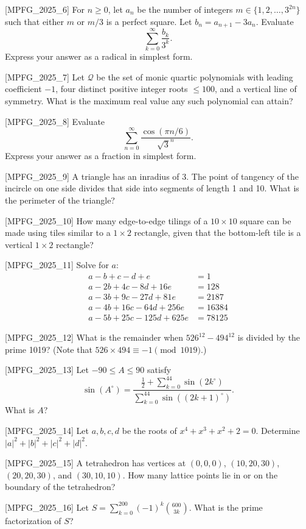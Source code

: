 [MPFG_2025_6]
For $n \ge 0$, let $a_n$ be the number of integers $m \in \{1, 2, \dots, 3^{2n}\}$ such that either $m$ or $m/3$ is a perfect square. Let $b_n = a_{n+1} - 3a_n$. Evaluate
$$\sum_{k=0}^\infty \frac{b_k}{3^k}.$$
Express your answer as a radical in simplest form.

[MPFG_2025_7]
Let $\mathcal{Q}$ be the set of monic quartic polynomials with leading coefficient $-1$, four distinct positive integer roots $\le 100$, and a vertical line of symmetry. What is the maximum real value any such polynomial can attain?

[MPFG_2025_8]
Evaluate
$$\sum_{n=0}^\infty \frac{\cos(\pi n / 6)}{\sqrt{3}^n}.$$
Express your answer as a fraction in simplest form.

[MPFG_2025_9]
A triangle has an inradius of 3. The point of tangency of the incircle on one side divides that side into segments of length 1 and 10. What is the perimeter of the triangle?

[MPFG_2025_10]
How many edge-to-edge tilings of a $10 \times 10$ square can be made using tiles similar to a $1 \times 2$ rectangle, given that the bottom-left tile is a vertical $1 \times 2$ rectangle?

[MPFG_2025_11]
Solve for $a$:
$$\begin{aligned}
a - b + c - d + e &= 1 \\
a - 2b + 4c - 8d + 16e &= 128 \\
a - 3b + 9c - 27d + 81e &= 2187 \\
a - 4b + 16c - 64d + 256e &= 16384 \\
a - 5b + 25c - 125d + 625e &= 78125
\end{aligned}$$

[MPFG_2025_12]
What is the remainder when $526^{12} - 494^{12}$ is divided by the prime 1019? (Note that $526 \times 494 \equiv -1 \pmod{1019}$.)

[MPFG_2025_13]
Let $-90 \le A \le 90$ satisfy
$$\sin(A^\circ) = \frac{\frac{1}{2} + \sum_{k=0}^{44} \sin(2k^\circ)}{\sum_{k=0}^{44} \sin((2k+1)^\circ)}.$$
What is $A$?

[MPFG_2025_14]
Let $a, b, c, d$ be the roots of $x^4 + x^3 + x^2 + 2 = 0$. Determine $|a|^2 + |b|^2 + |c|^2 + |d|^2$.

[MPFG_2025_15]
A tetrahedron has vertices at $(0,0,0)$, $(10, 20, 30)$, $(20, 20, 30)$, and $(30, 10, 10)$. How many lattice points lie in or on the boundary of the tetrahedron?

[MPFG_2025_16]
Let $S = \sum_{k=0}^{200} (-1)^k \binom{600}{3k}$. What is the prime factorization of $S$?

